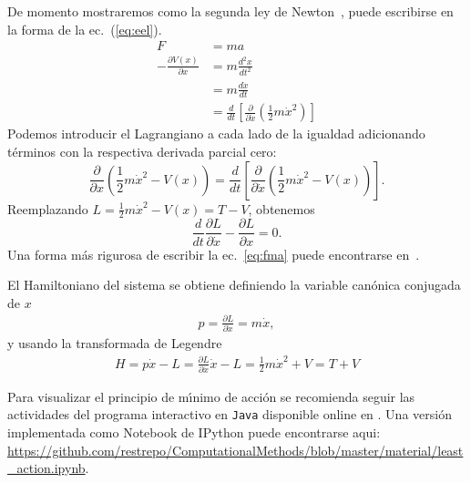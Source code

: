 De momento mostraremos como la segunda ley de Newton~\cite{NewtonSeconLaw}, puede escribirse en la forma de la ec.~(\ref{eq:eel}).
\begin{align}
\label{eq:fma}
  F&=ma\\
  -\frac{\partial V(x)}{\partial x}&=m\frac{d^2x}{dt^2}\nonumber\\
  &=m\frac{d\dot{x}}{dt}\nonumber\\
  &=\frac{d}{dt}
  \left[
    \frac{\partial}{\partial\dot{x}}
    \left(
      \frac{1}{2}m\dot{x}^2
    \right)
  \right]\nonumber
\end{align}
Podemos introducir el Lagrangiano a cada lado de la igualdad adicionando t\'erminos con la respectiva derivada parcial cero:
\begin{equation*}
  \frac{\partial}{\partial x}
  \left(
\frac{1}{2}m\dot{x}^2-V(x)
  \right)=\frac{d}{dt}
  \left[
    \frac{\partial}{\partial\dot{x}}
    \left(
      \frac{1}{2}m\dot{x}^2-V(x)
    \right)
  \right].
\end{equation*}
Reemplazando $L=\frac{1}{2}m\dot{x}^2-V(x)=T-V$, obtenemos
\begin{equation*}
\frac{d}{dt}\frac{\partial L}{\partial\dot{x}}  -\frac{\partial L}{\partial x}=0.
\end{equation*}
Una forma m\'as rigurosa de escribir la ec.~\eqref{eq:fma} puede encontrarse en~\cite{ActionPhysics}. 

El Hamiltoniano del sistema se obtiene definiendo la variable can\'onica conjugada de $x$
\begin{align}
  p=\frac{\partial L}{\partial\dot{x}}=m \dot{x},
\end{align}
y usando la transformada de Legendre
\begin{align}
  H=p \dot{x}-L=\frac{\partial{L}}{\partial\dot{x}}\dot{x}-L=\frac{1}{2}m\dot{x}^2+V=T+V
\end{align}

Para visualizar el principio de m\'\i nimo de acci\'on se recomienda seguir las actividades del programa interactivo en \texttt{Java} disponible online en \cite{JavaAP}. 
Una versión implementada como Notebook de IPython puede encontrarse aqui: \url{https://github.com/restrepo/ComputationalMethods/blob/master/material/least_action.ipynb}.


